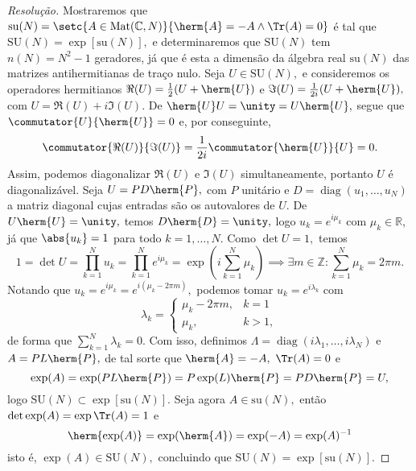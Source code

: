\begin{proof}[Resolução]
    Mostraremos que \(\mathrm{su}(N) = \setc{A \in \mathrm{Mat}(\mathbb{C}, N)}{\herm{A} = -A \land \Tr(A) = 0}\) é tal que \(\mathrm{SU}(N) = \exp\left[\mathrm{su}(N)\right],\) e determinaremos que \(\mathrm{SU}(N)\) tem \(n(N) = N^2 - 1\) geradores, já que é esta a dimensão da álgebra real \(\mathrm{su}(N)\) das matrizes antihermitianas de traço nulo. Seja \(U \in \mathrm{SU}(N),\) e consideremos os operadores hermitianos \(\Re(U) = \frac12 (U + \herm{U})\) e \(\Im(U) = \frac{1}{2i} (U + \herm{U}),\) com \(U = \Re(U) + i \Im(U).\) De \(\herm{U}U = \unity = U \herm{U},\) segue que \(\commutator{U}{\herm{U}} = 0\) e, por conseguinte,
    \begin{equation*}
        \commutator{\Re(U)}{\Im(U)} = \frac{1}{2i} \commutator{\herm{U}}{U} = 0.
    \end{equation*}
    Assim, podemos diagonalizar \(\Re(U)\) e \(\Im(U)\) simultaneamente, portanto \(U\) é diagonalizável. Seja \(U = P D \herm{P},\) com \(P\) unitário e \(D = \operatorname{diag}(u_1,\dots, u_N)\) a matriz diagonal cujas entradas são os autovalores de \(U.\) De \(U \herm{U} = \unity,\) temos \(D \herm{D} = \unity,\) logo \(u_k = e^{i \mu_k}\) com \(\mu_k \in \mathbb{R}\), já que \(\abs{u_k} = 1\) para todo \(k = 1, \dots, N.\) Como \(\det U = 1,\) temos
    \begin{equation*}
        1 = \det U = \prod_{k = 1}^N u_k = \prod_{k = 1}^N e^{i \mu_k} = \exp\left(i \sum_{k = 1}^N \mu_k\right) \implies \exists m \in \mathbb{Z} : \sum_{k = 1}^N \mu_k = 2\pi m.
    \end{equation*}
    Notando que \(u_k = e^{i\mu_k} = e^{i (\mu_k - 2\pi m)},\) podemos tomar \(u_k = e^{i \lambda_k}\) com
    \begin{equation*}
        \lambda_k = \begin{cases}
            \mu_k - 2\pi m,& k = 1\\
            \mu_k,& k > 1,
        \end{cases}
    \end{equation*}
    de forma que \(\sum_{k = 1}^N \lambda_k = 0.\) Com isso, definimos \(\Lambda = \operatorname{diag}(i \lambda_1, \dots, i \lambda_N)\) e \(A = P L \herm{P},\) de tal sorte que \(\herm{A} = -A,\) \(\Tr(A) = 0\) e
    \begin{equation*}
        \exp(A) = \exp(P L \herm{P}) = P \exp(L) \herm{P} = P D \herm{P} = U,
    \end{equation*}
    logo \(\mathrm{SU}(N) \subset \exp\left[\mathrm{su}(N)\right].\) Seja agora \(A \in \mathrm{su}(N),\) então \(\det \exp(A) = \exp \Tr(A) = 1\) e 
    \begin{equation*}
        \herm{\exp(A)} = \exp(\herm{A}) = \exp(-A) = \exp(A)^{-1}
    \end{equation*}
    isto é, \(\exp(A) \in \mathrm{SU}(N),\) concluindo que \(\mathrm{SU}(N) = \exp\left[\mathrm{su}(N)\right].\)


\end{proof}
